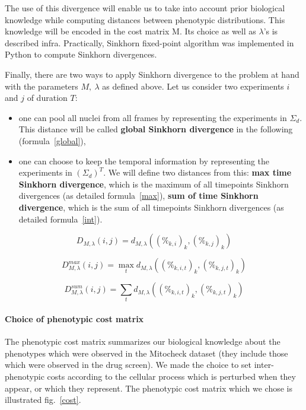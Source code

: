 The use of this divergence will enable us to take into account prior biological knowledge while computing distances between phenotypic distributions. This knowledge will be encoded in the cost matrix M. Its choice as well as $\lambda$'s is described infra. Practically, Sinkhorn fixed-point algorithm was implemented in Python to compute Sinkhorn divergences.

Finally, there are two ways to apply Sinkhorn divergence to the problem at hand with the parameters $M,~ \lambda$ as defined above. Let us consider two experiments $i$ and $j$ of duration $T$: 

\begin{itemize}
\item one can pool all nuclei from all frames by representing the experiments in $\Sigma_d$. This distance will be called \textbf{global Sinkhorn divergence} in the following (formula~\ref{global}),
\item one can choose to keep the temporal information by representing the experiments in $\left(\Sigma_d\right) ^T$. We will define two distances from this:
\subitem \textbf{max time Sinkhorn divergence}, which is the maximum of all timepoints Sinkhorn divergences (as detailed formula~\ref{max}),
\subitem \textbf{sum of time Sinkhorn divergence}, which is the sum of all timepoints Sinkhorn divergences (as detailed formula~\ref{int}).
\end{itemize}
\begin{equation}
D_{M,\lambda}(i,j)= d_{M,\lambda}((\%_{k,i})_{k},(\%_{k,j})_{k})
\label{global}
\end{equation}

\begin{equation}
D_{M,\lambda}^{max}(i,j)= \max_t d_{M,\lambda}((\%_{k,i,t})_{k},(\%_{k,j,t})_{k})
\label{max}
\end{equation}

\begin{equation}
D_{M,\lambda}^{sum}(i,j)= \sum_t d_{M,\lambda}((\%_{k,i,t})_{k},(\%_{k,j,t})_{k})
\label{int}
\end{equation}

\paragraph{Choice of phenotypic cost matrix}
The phenotypic cost matrix summarizes our biological knowledge about the phenotypes which were observed in the Mitocheck dataset (they include those which were observed in the drug screen). We made the choice to set inter-phenotypic costs according to the cellular process which is perturbed when they appear, or which they represent. The phenotypic cost matrix which we chose is illustrated fig.~\ref{cost}.


